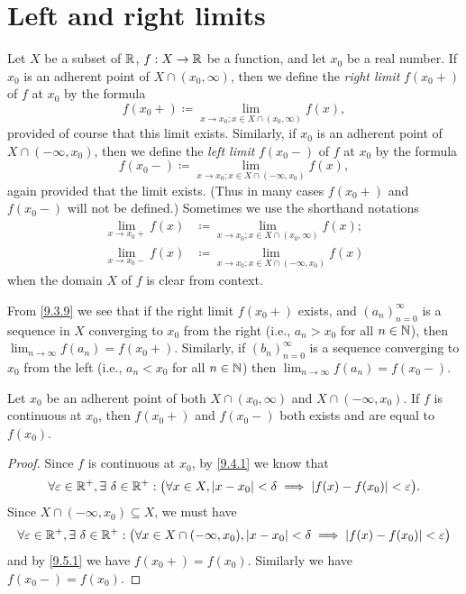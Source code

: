 \section{Left and right limits}\label{sec:9.5}

\begin{defn}\label{9.5.1}
  Let \(X\) be a subset of \(\mathbb{R}\), \(f : X \to \mathbb{R}\) be a function, and let \(x_0\) be a real number.
  If \(x_0\) is an adherent point of \(X \cap (x_0, \infty)\), then we define the \emph{right limit} \(f(x_0+)\) of \(f\) at \(x_0\) by the formula
  \[
    f(x_0+) \coloneqq \lim_{x \to x_0 ; x \in X \cap (x_0, \infty)} f(x),
  \]
  provided of course that this limit exists.
  Similarly, if \(x_0\) is an adherent point of \(X \cap (-\infty, x_0)\), then we define the \emph{left limit} \(f(x_0-)\) of \(f\) at \(x_0\) by the formula
  \[
    f(x_0-) \coloneqq \lim_{x \to x_0 ; x \in X \cap (-\infty, x_0)} f(x),
  \]
  again provided that the limit exists.
  (Thus in many cases \(f(x_0+)\) and \(f(x_0-)\) will not be defined.)
  Sometimes we use the shorthand notations
  \begin{align*}
    \lim_{x \to x_0+} f(x) & \coloneqq \lim_{x \to x_0 ; x \in X \cap (x_0, \infty)} f(x); \\
    \lim_{x \to x_0-} f(x) & \coloneqq \lim_{x \to x_0 ; x \in X \cap (-\infty, x_0)} f(x)
  \end{align*}
  when the domain \(X\) of \(f\) is clear from context.
\end{defn}

\begin{note}
  From \cref{9.3.9} we see that if the right limit \(f(x_0+)\) exists, and \((a_n)_{n = 0}^\infty\) is a sequence in \(X\) converging to \(x_0\) from the right (i.e., \(a_n > x_0\) for all \(n \in \mathbb{N}\)), then \(\lim_{n \to \infty} f(a_n) = f(x_0+)\).
  Similarly, if \((b_n)_{n = 0}^\infty\) is a sequence converging to \(x_0\) from the left (i.e., \(a_n < x_0\) for all \(n \in \mathbb{N}\)) then \(\lim_{n \to \infty} f(a_n) = f(x_0-)\).
\end{note}

\begin{ac}\label{ac:9.5.1}
  Let \(x_0\) be an adherent point of both \(X \cap (x_0, \infty)\) and \(X \cap (-\infty, x_0)\).
  If \(f\) is continuous at \(x_0\), then \(f(x_0+)\) and \(f(x_0-)\) both exists and are equal to \(f(x_0)\).
\end{ac}

\begin{proof}
  Since \(f\) is continuous at \(x_0\), by \cref{9.4.1} we know that
  \[
    \forall \varepsilon \in \mathbb{R}^+, \exists\ \delta \in \mathbb{R}^+ : \big(\forall x \in X, \left\lvert x - x_0\right\rvert < \delta \implies \left\lvert f(x) - f(x_0)\right\rvert < \varepsilon\big).
  \]
  Since \(X \cap (-\infty, x_0) \subseteq X\), we must have
  \[
    \forall \varepsilon \in \mathbb{R}^+, \exists\ \delta \in \mathbb{R}^+ : \big(\forall x \in X \cap (-\infty, x_0), \left\lvert x - x_0\right\rvert < \delta \implies \left\lvert f(x) - f(x_0)\right\rvert < \varepsilon\big)
  \]
  and by \cref{9.5.1} we have \(f(x_0+) = f(x_0)\).
  Similarly we have \(f(x_0-) = f(x_0)\).
\end{proof}

